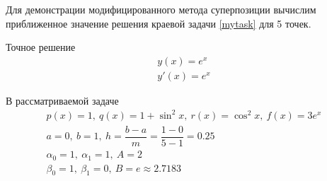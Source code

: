 \documentclass[a4paper, 12pt]{article}
\begin{document}
	Для демонстрации модифицированного метода суперпозиции вычислим приближенное значение решения краевой задачи \eqref{mytask} для 5 точек.
	
	Точное решение
	\begin{equation*}
		\begin{gathered}
			y(x)=e^x\\
			y'(x)=e^x
		\end{gathered}
	\end{equation*}
	
	В рассматриваемой задаче
	\begin{equation*}
		\begin{gathered}
			p(x)=1,\ q(x)=1+\sin^2x, \ r(x)=\cos^2x, \ f(x) = 3e^x\\
			a = 0,\ b = 1,\ h=\dfrac{b-a}{m}=\dfrac{1-0}{5-1}=0.25\\
			\alpha_0=1,\ \alpha_1=1,\ A=2\\
			\beta_0=1,\ \beta_1=0,\ B=e\approx2.7183
		\end{gathered}
	\end{equation*}
\end{document}
